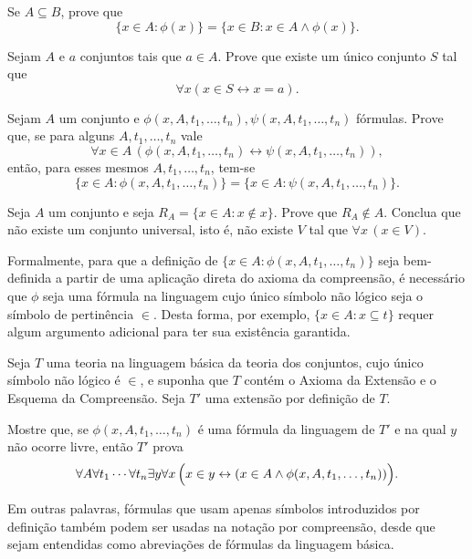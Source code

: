 \begin{exercise}
Se $A\subseteq B$, prove que
\[
\{x\in A:\phi(x)\}
=
\{x\in B:x\in A\land \phi(x)\}.
\]
\end{exercise}

\begin{exercise}
Sejam $A$ e $a$ conjuntos tais que $a\in A$. Prove que existe um único conjunto $S$
tal que
\[
\forall x(x\in S\leftrightarrow x=a).
\]
\end{exercise}

\begin{exercise}
Sejam $A$ um conjunto e $\phi(x, A, t_1, \ldots, t_n),\psi(x, A, t_1, \ldots, t_n)$ fórmulas.
Prove que, se para alguns $A, t_1, \ldots, t_n$ vale
\[
\forall x\in A\,(\phi(x, A, t_1, \ldots, t_n)\leftrightarrow \psi(x, A, t_1, \ldots, t_n)),
\]
então, para esses mesmos $A, t_1, \ldots, t_n$, tem-se
\[
\{x\in A:\phi(x, A, t_1, \ldots, t_n)\}=\{x\in A:\psi(x, A, t_1, \ldots, t_n)\}.
\]
\end{exercise}

\begin{exercise}
    Seja $A$ um conjunto e seja $R_A = \{x \in A : x \notin x\}$.
    Prove que $R_A \notin A$.
    Conclua que não existe um conjunto universal, isto é, não existe $V$ tal que $\forall x\, (x \in V)$.
\end{exercise}

\begin{exercise}\label{exr:compreensaoDefinicao}
    Formalmente, para que a definição de $\{x \in A : \phi(x, A, t_1, \ldots, t_n)\}$ seja bem-definida a partir de uma aplicação direta do axioma da compreensão, é necessário que $\phi$ seja uma fórmula na linguagem cujo único símbolo não lógico seja o símbolo de pertinência $\in$.
    Desta forma, por exemplo, $\{x \in A: x\subseteq t\}$ requer algum argumento adicional para ter sua existência garantida.

    Seja $T$ uma teoria na linguagem básica da teoria dos conjuntos, cujo único símbolo
    não lógico é $\in$, e suponha que $T$ contém o Axioma da Extensão e o Esquema da
    Compreensão. Seja $T'$ uma extensão por definição de $T$.

    Mostre que, se $\phi(x,A,t_1,\ldots,t_n)$ é uma fórmula da linguagem de $T'$ e na qual $y$ não ocorre livre,
    então $T'$ prova
    \[
    \forall A\forall t_1\cdots\forall t_n\exists y\forall x\,
    \Bigl(x\in y\leftrightarrow
    (x\in A\land \phi(x,A,t_1,\ldots,t_n))\Bigr).
    \]

    Em outras palavras, fórmulas que usam apenas símbolos introduzidos por definição
    também podem ser usadas na notação por compreensão, desde que sejam entendidas
    como abreviações de fórmulas da linguagem básica.
\end{exercise}
